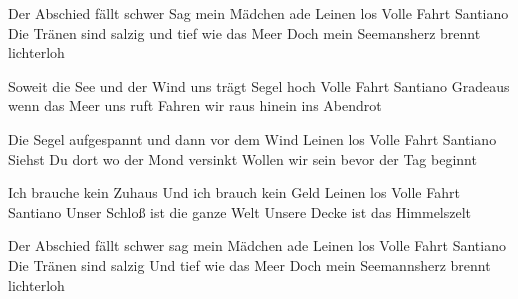 \medskip

\begin{guitar}
  Der Abschied fällt schwer
  Sag mein Mädchen ade
  Leinen los
  Volle Fahrt Santiano
  Die Tränen sind salzig und tief wie das Meer
  Doch mein Seemansherz brennt lichterloh

  Soweit die See und der Wind uns trägt
  Segel hoch
  Volle Fahrt Santiano
  Gradeaus wenn das Meer uns ruft
  Fahren wir raus hinein ins Abendrot

  Die Segel aufgespannt und dann vor dem Wind
  Leinen los
  Volle Fahrt Santiano
  Siehst Du dort wo der Mond versinkt
  Wollen wir sein bevor der Tag beginnt

   

  Ich brauche kein Zuhaus
  Und ich brauch kein Geld
  Leinen los
  Volle Fahrt Santiano
  Unser Schloß ist die ganze Welt
  Unsere Decke ist das Himmelszelt

   

  Der Abschied fällt schwer sag mein Mädchen ade
  Leinen los
  Volle Fahrt Santiano
  Die Tränen sind salzig
  Und tief wie das Meer
  Doch mein Seemannsherz brennt lichterloh

   
\end{guitar}
